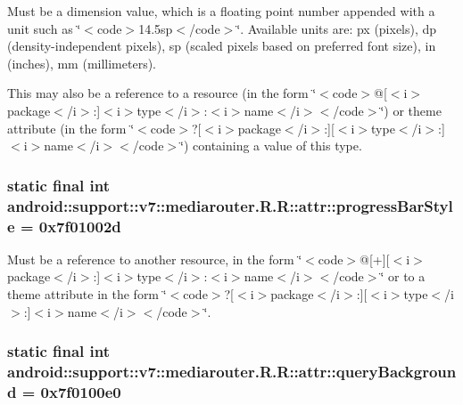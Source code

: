 Must be a dimension value, which is a floating point number appended with a unit such as \char`\"{}$<$code$>$14.5sp$<$/code$>$\char`\"{}. Available units are: px (pixels), dp (density-independent pixels), sp (scaled pixels based on preferred font size), in (inches), mm (millimeters). 

This may also be a reference to a resource (in the form \char`\"{}$<$code$>$@\mbox{[}$<$i$>$package$<$/i$>$:\mbox{]}$<$i$>$type$<$/i$>$:$<$i$>$name$<$/i$>$$<$/code$>$\char`\"{}) or theme attribute (in the form \char`\"{}$<$code$>$?\mbox{[}$<$i$>$package$<$/i$>$:\mbox{]}\mbox{[}$<$i$>$type$<$/i$>$:\mbox{]}$<$i$>$name$<$/i$>$$<$/code$>$\char`\"{}) containing a value of this type. \hypertarget{classandroid_1_1support_1_1v7_1_1mediarouter_1_1_r_1_1attr_11dca063dae1b7001ae11066a91a4140}{
\subsubsection[{progressBarStyle}]{\setlength{\rightskip}{0pt plus 5cm}static final int android::support::v7::mediarouter.R.R::attr::progressBarStyle = 0x7f01002d}}
\label{classandroid_1_1support_1_1v7_1_1mediarouter_1_1_r_1_1attr_11dca063dae1b7001ae11066a91a4140}


Must be a reference to another resource, in the form \char`\"{}$<$code$>$@\mbox{[}+\mbox{]}\mbox{[}$<$i$>$package$<$/i$>$:\mbox{]}$<$i$>$type$<$/i$>$:$<$i$>$name$<$/i$>$$<$/code$>$\char`\"{} or to a theme attribute in the form \char`\"{}$<$code$>$?\mbox{[}$<$i$>$package$<$/i$>$:\mbox{]}\mbox{[}$<$i$>$type$<$/i$>$:\mbox{]}$<$i$>$name$<$/i$>$$<$/code$>$\char`\"{}. \hypertarget{classandroid_1_1support_1_1v7_1_1mediarouter_1_1_r_1_1attr_4e62ef797ceb9aed0f056d683d0a3620}{
\subsubsection[{queryBackground}]{\setlength{\rightskip}{0pt plus 5cm}static final int android::support::v7::mediarouter.R.R::attr::queryBackground = 0x7f0100e0}}
\label{classandroid_1_1support_1_1v7_1_1mediarouter_1_1_r_1_1attr_4e62ef797ceb9aed0f056d683d0a3620}



